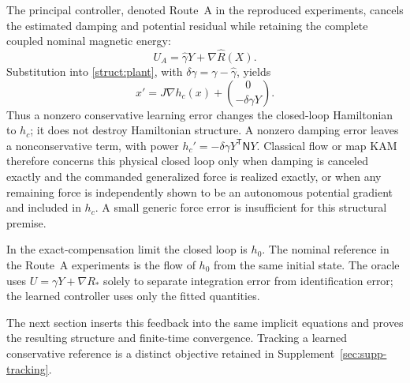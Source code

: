 The principal controller, denoted Route~A in the reproduced experiments, cancels the estimated damping and potential residual while retaining the complete coupled nominal magnetic energy:
\begin{equation}\label{struct:route-a-control}
 U_A=\widehat\gamma Y+\nabla\widehat R(X).
\end{equation}
Substitution into \eqref{struct:plant}, with $\delta\gamma=\gamma-\widehat\gamma$, yields
\begin{equation}\label{struct:route-a-closed}
 x'=J\nabla h_c(x)+\binom{0}{-\delta\gamma Y}.
\end{equation}
Thus a nonzero conservative learning error changes the closed-loop Hamiltonian to $h_c$; it does not destroy Hamiltonian structure. A nonzero damping error leaves a nonconservative term, with power $h_c'=-\delta\gamma Y^{\mathsf T}\mathsf N Y$. Classical flow or map KAM therefore concerns this physical closed loop only when damping is canceled exactly and the commanded generalized force is realized exactly, or when any remaining force is independently shown to be an autonomous potential gradient and included in $h_c$. A small generic force error is insufficient for this structural premise.

In the exact-compensation limit the closed loop is $h_0$. The nominal reference in the Route~A experiments is the flow of $h_0$ from the same initial state. The oracle uses $U=\gamma Y+\nabla R_*$ solely to separate integration error from identification error; the learned controller uses only the fitted quantities.


The next section inserts this feedback into the same implicit equations and proves the resulting structure and finite-time convergence. Tracking a learned conservative reference is a distinct objective retained in Supplement~\ref{sec:supp-tracking}.
